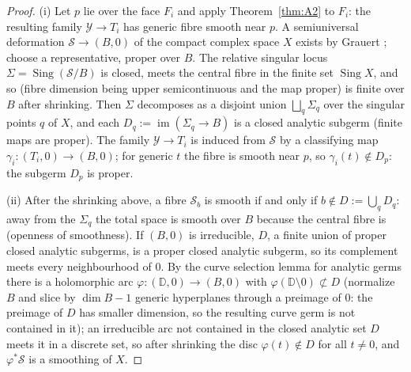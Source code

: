 \documentclass[11pt]{amsart}
\theoremstyle{definition}
\theoremstyle{remark}
\newcommand{\Sing}{\operatorname{Sing}}
\begin{document}
\begin{proof}
(i)  Let $p$ lie over the face $F_i$ and apply Theorem~\ref{thm:A2} to
$F_i$: the resulting family $\mathcal{Y}\to T_i$ has generic fibre
smooth near $p$.  A semiuniversal deformation
$\mathcal{S} \to (B,0)$ of the compact complex space $X$ exists by
Grauert \cite{Grauert74}; choose a representative, proper over $B$.
The relative singular locus $\Sigma = \Sing(\mathcal{S}/B)$ is closed,
meets the central fibre in the finite set $\Sing X$, and so (fibre
dimension being upper semicontinuous and the map proper) is finite
over $B$ after shrinking.  Then $\Sigma$ decomposes as a disjoint union
$\bigsqcup_q \Sigma_q$ over the singular points $q$ of $X$, and each
$D_q := \operatorname{im}(\Sigma_q \to B)$ is a closed analytic subgerm
(finite maps are proper).  The family $\mathcal{Y} \to T_i$ is induced
from $\mathcal{S}$ by a classifying map $\gamma_i : (T_i,0) \to (B,0)$;
for generic $t$ the fibre is smooth near $p$, so
$\gamma_i(t) \notin D_p$: the subgerm $D_p$ is proper.

(ii)  After the shrinking above, a fibre $\mathcal{S}_b$ is smooth if and
only if $b \notin D := \bigcup_q D_q$: away from the $\Sigma_q$ the total
space is smooth over $B$ because the central fibre is (openness of
smoothness).  If $(B,0)$ is irreducible, $D$, a finite union of proper
closed analytic subgerms, is a proper closed analytic subgerm, so its
complement meets every neighbourhood of $0$.  By the curve selection
lemma for analytic germs there is a holomorphic arc
$\varphi : (\mathbb{D},0) \to
(B,0)$ with $\varphi(\mathbb{D}\setminus 0) \not\subset D$
(normalize $B$ and slice by $\dim B - 1$ generic hyperplanes through a
preimage of $0$: the preimage of $D$ has smaller dimension, so the
resulting curve germ is not contained in it); an
irreducible arc not contained in the closed analytic set $D$ meets it
in a discrete set, so after shrinking the disc $\varphi(t) \notin D$
for all $t \neq 0$, and $\varphi^\ast\mathcal{S}$ is a smoothing of $X$.


\end{proof}
\end{document}
